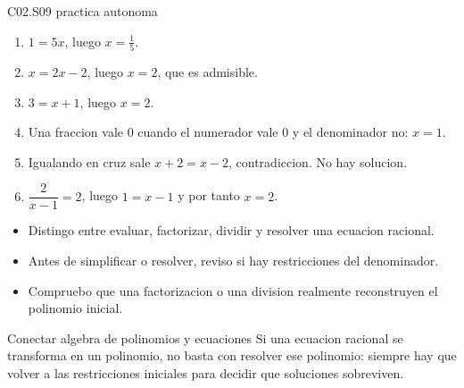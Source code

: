 \begin{fullsolution}{C02.S09 practica autonoma}
\begin{enumerate}[label=\textbf{PX-C02.S09-\arabic*:}, leftmargin=*]
  \item \(1=5x\), luego \(x=\frac{1}{5}\).
  \item \(x=2x-2\), luego \(x=2\), que es admisible.
  \item \(3=x+1\), luego \(x=2\).
  \item Una fraccion vale \(0\) cuando el numerador vale \(0\) y el denominador no: \(x=1\).
  \item Igualando en cruz sale \(x+2=x-2\), contradiccion. No hay solucion.
  \item \(\dfrac{2}{x-1}=2\), luego \(1=x-1\) y por tanto \(x=2\).
\end{enumerate}
\end{fullsolution}

\begin{selfcheck}
\begin{itemize}
  \item Distingo entre evaluar, factorizar, dividir y resolver una ecuacion racional.
  \item Antes de simplificar o resolver, reviso si hay restricciones del denominador.
  \item Compruebo que una factorizacion o una division realmente reconstruyen el polinomio inicial.
\end{itemize}
\end{selfcheck}

\begin{extension}{Conectar algebra de polinomios y ecuaciones}
Si una ecuacion racional se transforma en un polinomio, no basta con resolver ese polinomio:
siempre hay que volver a las restricciones iniciales para decidir que soluciones sobreviven.
\end{extension}
